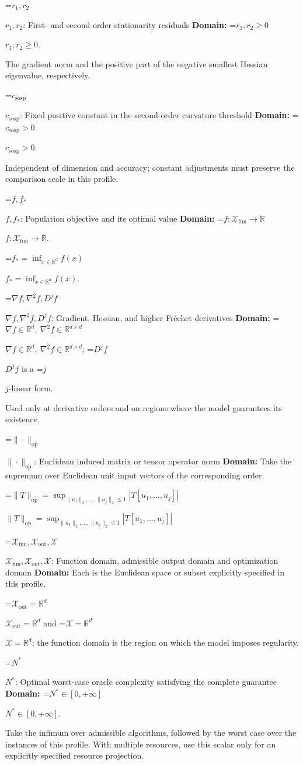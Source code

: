 \documentclass[10pt,a4paper]{article}
\newcommand{\AtlasMath}[1]{\par\begingroup\centering\setbox0=\hbox{$\displaystyle #1$}\ifdim\wd0>1.4\linewidth\typeout{ATLAS WIDE FORMULA: \the\wd0}\fi\ifdim\wd0>\linewidth\resizebox{\linewidth}{!}{\box0}\else\box0\fi\par\endgroup}
\newcommand{\AtlasInlineMath}[1]{\begingroup\setbox0=\hbox{$#1$}\ifdim\wd0>.4\linewidth\endgroup\AtlasMath{#1}\else\endgroup$#1$\fi}
\begin{document}
\AtlasInlineMath{r_1,r_2}: First- and second-order stationarity residuals \textbf{Domain:} \AtlasInlineMath{r_1,r_2\ge0}.

The gradient norm and the positive part of the negative smallest Hessian eigenvalue, respectively.

\AtlasInlineMath{c_{\mathrm{sosp}}}: Fixed positive constant in the second-order curvature threshold \textbf{Domain:} \AtlasInlineMath{c_{\mathrm{sosp}}>0}.

Independent of dimension and accuracy; constant adjustments must preserve the comparison scale in this profile.

\AtlasInlineMath{f,f_*}: Population objective and its optimal value \textbf{Domain:} \AtlasInlineMath{f:\mathcal{X}_{\mathrm{fun}}\to\mathbb{R}}.

\AtlasInlineMath{f_*=\inf_{x\in \mathbb{R}^d}f(x)}.

\AtlasInlineMath{\nabla f,\nabla^2f,D^jf}: Gradient, Hessian, and higher Fréchet derivatives \textbf{Domain:} \AtlasInlineMath{\nabla f\in\mathbb{R}^d,\ \nabla^2f\in\mathbb{R}^{d\times d}}; \AtlasInlineMath{D^jf} is a \AtlasInlineMath{j}-linear form.

Used only at derivative orders and on regions where the model guarantees its existence.

\AtlasInlineMath{\|\cdot\|_{\mathrm{op}}}: Euclidean induced matrix or tensor operator norm \textbf{Domain:} Take the supremum over Euclidean unit input vectors of the corresponding order.

\AtlasInlineMath{\|T\|_{\mathrm{op}}=\sup_{\|u_1\|_2,\ldots,\|u_j\|_2\le1}|T[u_1,\ldots,u_j]|}

\AtlasInlineMath{\mathcal{X}_{\mathrm{fun}},\mathcal{X}_{\mathrm{out}},\mathcal{X}}: Function domain, admissible output domain and optimization domain \textbf{Domain:} Each is the Euclidean space or subset explicitly specified in this profile.

\AtlasInlineMath{\mathcal{X}_{\mathrm{out}}=\mathbb{R}^d} and \AtlasInlineMath{\mathcal{X}=\mathbb{R}^d}; the function domain is the region on which the model imposes regularity.

\AtlasInlineMath{N^*}: Optimal worst-case oracle complexity satisfying the complete guarantee \textbf{Domain:} \AtlasInlineMath{N^*\in[0,+\infty]}.

Take the infimum over admissible algorithms, followed by the worst case over the instances of this profile. With multiple resources, use this scalar only for an explicitly specified resource projection.
\end{document}
